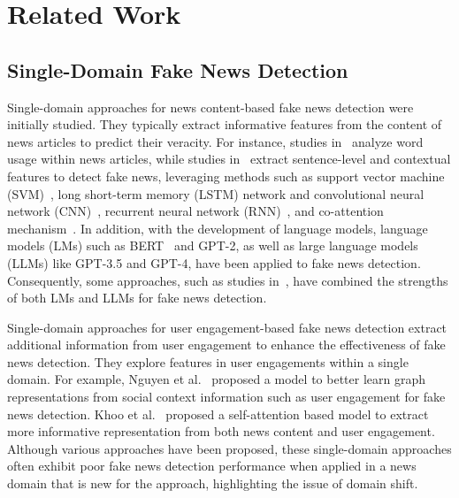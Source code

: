 \section{Related Work}
\subsection{Single-Domain Fake News Detection}
Single-domain approaches for news content-based fake news detection were initially studied. They typically extract informative features from the content of news articles to predict their veracity. For instance, studies in~\cite{perez2017automatic, volkova2017separating} analyze word usage within news articles, while studies in~\cite{shu2019defend, ma2016detecting} extract sentence-level and contextual features to detect fake news, leveraging methods such as support vector machine (SVM)~\cite{perez2017automatic}, long short-term memory (LSTM) network and convolutional neural network (CNN)~\cite{volkova2017separating}, recurrent neural network (RNN)~\cite{ma2016detecting}, and co-attention mechanism~\cite{shu2019defend}. In addition, with the development of language models, language models (LMs) such as BERT~\cite{devlin2018bert} and GPT-2, as well as large language models (LLMs) like GPT-3.5 and GPT-4, have been applied to fake news detection. Consequently, some approaches, such as studies in~\cite{hu2024bad}, have combined the strengths of both LMs and LLMs for fake news detection. 

Single-domain approaches for user engagement-based fake news detection extract additional information from user engagement to enhance the effectiveness of fake news detection. They explore features in user engagements within a single domain. For example, Nguyen et al.~\cite{nguyen2020fang} proposed a model to better learn graph representations from social context information such as user engagement for fake news detection. Khoo et al.~\cite{khoo2020interpretable} proposed a self-attention based model to extract more informative representation from both news content and user engagement. Although various approaches have been proposed, these single-domain approaches often exhibit poor fake news detection performance when applied in a news domain that is new for the approach, highlighting the issue of domain shift.

